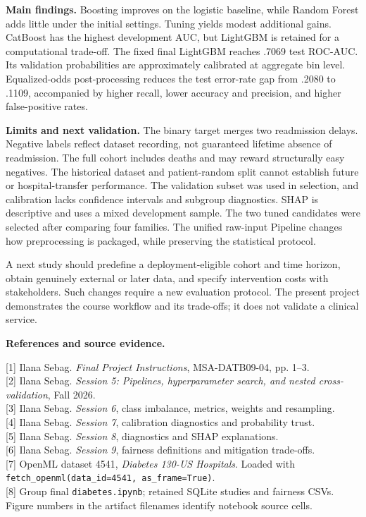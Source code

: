 \documentclass[11pt,a4paper]{article}
\begin{document}
\textbf{Main findings.} Boosting improves on the logistic baseline, while Random Forest adds little under the initial settings. Tuning yields modest additional gains. CatBoost has the highest development AUC, but LightGBM is retained for a computational trade-off. The fixed final LightGBM reaches .7069 test ROC-AUC. Its validation probabilities are approximately calibrated at aggregate bin level. Equalized-odds post-processing reduces the test error-rate gap from .2080 to .1109, accompanied by higher recall, lower accuracy and precision, and higher false-positive rates.

\textbf{Limits and next validation.} The binary target merges two readmission delays. Negative labels reflect dataset recording, not guaranteed lifetime absence of readmission. The full cohort includes deaths and may reward structurally easy negatives. The historical dataset and patient-random split cannot establish future or hospital-transfer performance. The validation subset was used in selection, and calibration lacks confidence intervals and subgroup diagnostics. SHAP is descriptive and uses a mixed development sample. The two tuned candidates were selected after comparing four families. The unified raw-input Pipeline changes how preprocessing is packaged, while preserving the statistical protocol.

A next study should predefine a deployment-eligible cohort and time horizon, obtain genuinely external or later data, and specify intervention costs with stakeholders. Such changes require a new evaluation protocol. The present project demonstrates the course workflow and its trade-offs; it does not validate a clinical service.

\textbf{References and source evidence.}\par
{\small
\mbox{[1]} Ilana Sebag. \emph{Final Project Instructions}, MSA-DATB09-04, pp. 1--3.\\
\mbox{[2]} Ilana Sebag. \emph{Session 5: Pipelines, hyperparameter search, and nested cross-validation}, Fall 2026.\\
\mbox{[3]} Ilana Sebag. \emph{Session 6}, class imbalance, metrics, weights and resampling.\\
\mbox{[4]} Ilana Sebag. \emph{Session 7}, calibration diagnostics and probability trust.\\
\mbox{[5]} Ilana Sebag. \emph{Session 8}, diagnostics and SHAP explanations.\\
\mbox{[6]} Ilana Sebag. \emph{Session 9}, fairness definitions and mitigation trade-offs.\\
\mbox{[7]} OpenML dataset 4541, \emph{Diabetes 130-US Hospitals}. Loaded with \texttt{fetch\_openml(data\_id=4541, as\_frame=True)}.\\
\mbox{[8]} Group final \texttt{diabetes.ipynb}; retained SQLite studies and fairness CSVs. Figure numbers in the artifact filenames identify notebook source cells.
}
\end{document}
